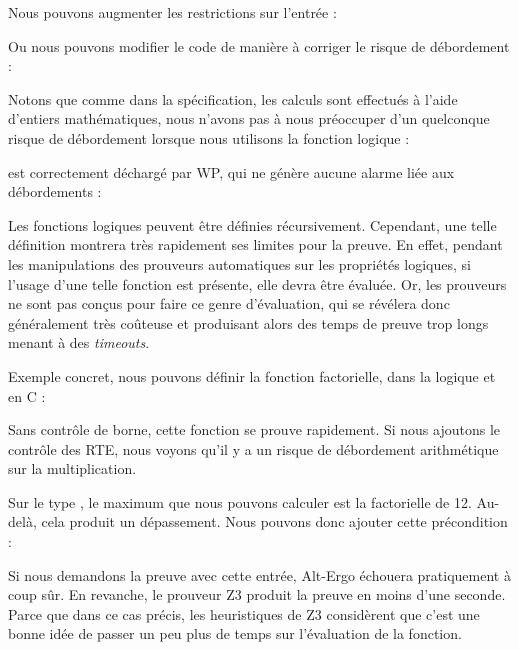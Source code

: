 Nous pouvons augmenter les restrictions sur l'entrée :




Ou nous pouvons modifier le code de manière à corriger le risque
de débordement :




Notons que comme dans la spécification, les calculs sont effectués à l'aide
d'entiers mathématiques, nous n'avons pas à nous préoccuper d'un quelconque
risque de débordement lorsque nous utilisons la fonction logique :




est correctement déchargé par WP, qui ne génère aucune alarme liée aux
débordements :






Les fonctions logiques peuvent être définies récursivement. Cependant, une telle
définition montrera très rapidement ses limites pour la preuve. En effet,
pendant les manipulations des prouveurs automatiques sur les propriétés
logiques, si l'usage d'une telle fonction est présente, elle devra être évaluée.
Or, les prouveurs ne sont pas conçus pour faire ce genre d'évaluation, qui se
révélera donc généralement très coûteuse et produisant alors des temps de preuve
trop longs menant à des \textit{timeouts}.



Exemple concret, nous pouvons définir la fonction factorielle, dans la logique
et en C :






Sans contrôle de borne, cette fonction se prouve rapidement. Si nous ajoutons
le contrôle des RTE, nous voyons qu'il y a un risque de débordement
arithmétique sur la multiplication.



Sur le type , le maximum que nous pouvons calculer est la factorielle de
12. Au-delà, cela produit un dépassement. Nous pouvons donc ajouter cette
précondition :






Si nous demandons la preuve avec cette entrée, Alt-Ergo échouera pratiquement à
coup sûr. En revanche, le prouveur Z3 produit la preuve en moins d'une seconde.
Parce que dans ce cas précis, les heuristiques de Z3 considèrent que c'est une
bonne idée de passer un peu plus de temps sur l'évaluation de la fonction.



